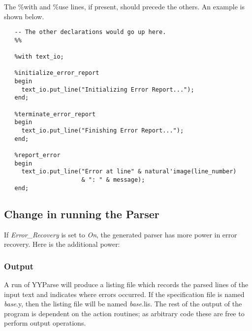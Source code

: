 The \%with and \%use lines, if present, should precede the others. An example
is shown below.

\begin{verbatim}
   -- The other declarations would go up here.
   %%
   
   %with text_io;

   %initialize_error_report
   begin
     text_io.put_line("Initializing Error Report...");
   end;

   %terminate_error_report
   begin
     text_io.put_line("Finishing Error Report...");
   end;

   %report_error
   begin
     text_io.put_line("Error at line" & natural'image(line_number)
                      & ": " & message);
   end;
\end{verbatim}

\subsection{Change in running the Parser}
If {\it Error\_Recovery} is set to {\it On}, the generated parser has more power
in error recovery. Here is the additional power:
\subsubsection{Output}
A run of YYParse will produce a listing file which records the parsed lines
of the input text and indicates where errors occurred. If the specification file
is named {\it base}.y, then the listing file will be named {\it base}.lis. The rest of the
output of the program is dependent on the action routines; as arbitrary code
these are free to perform output operations.\\

